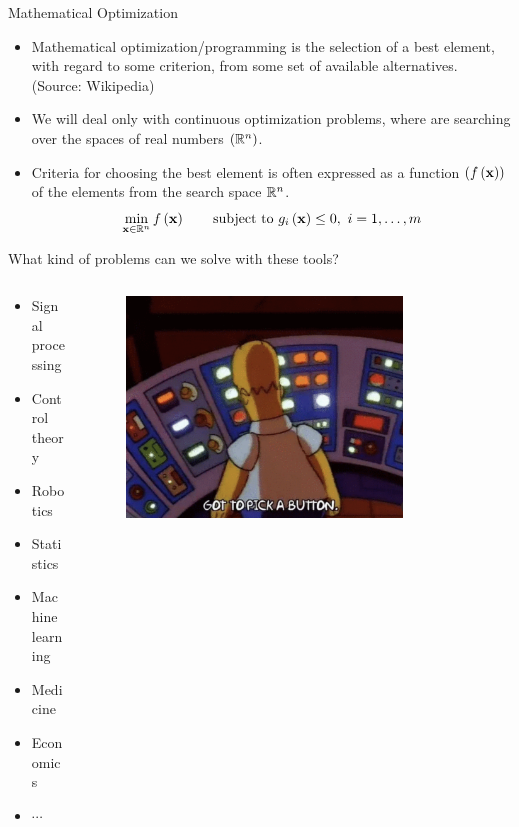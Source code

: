 \documentclass[aspectratio=169]{beamer}
\let\olditem\item
\renewcommand{\item}{\setlength{\itemsep}{\fill}\olditem}
\def\mf{\ensuremath\mathbf}
\def\mb{\ensuremath\mathbb}
\def\lp{\ensuremath\left(}
\def\rp{\ensuremath\right)}
\newcommand{\ct}[1]{\lp #1\rp}
\begin{document}
\begin{frame}{Mathematical Optimization}
  \begin{itemize}
    \item Mathematical optimization/programming is the selection of a best element, with regard to some criterion, from some set of available alternatives. (Source: Wikipedia)
    
    \item We will deal only with continuous optimization problems, where are searching over the spaces of real numbers $\ct{\mb{R}^n}$.
    
    \item Criteria for choosing the best element is often expressed as a function $\ct{f\ct{\mf{x}}}$ of the elements from the search space $\mb{R}^n$.
    \[ \min_{\mf{x} \in \mb{R}^n} f\ct{\mf{x}} \quad \quad \mathrm{subject \,\, to} \,\, g_i\ct{\mf{x}} \leq 0, \,\, i = 1, \ldots, m \]
  \end{itemize}
\end{frame}
  

\begin{frame}{What kind of problems can we solve with these tools?}
  \begin{columns}
    \begin{column}{0.3\textwidth}
      \begin{itemize}
        \item Signal processing
        \item Control theory
        \item Robotics
        \item Statistics
        \item Machine learning
        \item Medicine
        \item Economics
        \item $\cdots$
      \end{itemize}
    \end{column}
    \begin{column}{0.675\textwidth}
      \begin{figure}
        \centering
        \includegraphics[width=0.8\textwidth]{toomany.png}
      \end{figure}
    \end{column}    
  \end{columns}
\end{frame}
\end{document}
